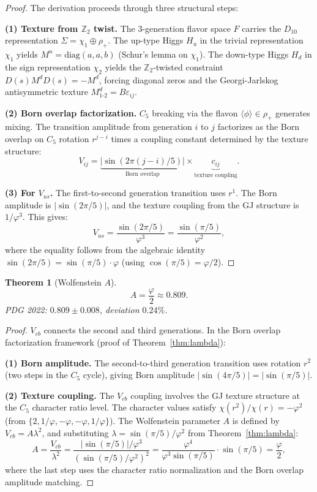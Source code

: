 \documentclass[11pt,a4paper]{article}
\newtheorem{theorem}{Theorem}
\begin{document}
\begin{proof}
The derivation proceeds through three structural steps:

\textbf{(1) Texture from $\mathbb{Z}_2$ twist.} The 3-generation flavor space $F$ carries the $D_{10}$ representation $\Sigma = \chi_1 \oplus \rho_+$. The up-type Higgs $H_u$ in the trivial representation $\chi_1$ yields $M^u = \text{diag}(a, a, b)$ (Schur's lemma on $\chi_1$). The down-type Higgs $H_d$ in the sign representation $\chi_2$ yields the $\mathbb{Z}_2$-twisted constraint $D(s)M^d D(s) = -M^d$, forcing diagonal zeros and the Georgi-Jarlskog antisymmetric texture $M^d_{1\text{-}2} = B\varepsilon_{ij}$.

\textbf{(2) Born overlap factorization.} $C_5$ breaking via the flavon $\langle\phi\rangle \in \rho_+$ generates mixing. The transition amplitude from generation $i$ to $j$ factorizes as the Born overlap on $C_5$ rotation $r^{j-i}$ times a coupling constant determined by the texture structure:
\[
V_{ij} = \underbrace{|\sin(2\pi(j-i)/5)|}_{\text{Born overlap}} \times \underbrace{c_{ij}}_{\text{texture coupling}}.
\]

\textbf{(3) For $V_{us}$.} The first-to-second generation transition uses $r^1$. The Born amplitude is $|\sin(2\pi/5)|$, and the texture coupling from the GJ structure is $1/\varphi^3$. This gives:
\[
V_{us} = \frac{\sin(2\pi/5)}{\varphi^3} = \frac{\sin(\pi/5)}{\varphi^2},
\]
where the equality follows from the algebraic identity $\sin(2\pi/5) = \sin(\pi/5) \cdot \varphi$ (using $\cos(\pi/5) = \varphi/2$).
\end{proof}

\begin{theorem}[Wolfenstein $A$]
\label{thm:A}
\[
A = \frac{\varphi}{2} \approx 0.809.
\]
PDG 2022: $0.809 \pm 0.008$, deviation $0.24\%$.
\end{theorem}

\begin{proof}
$V_{cb}$ connects the second and third generations. In the Born overlap factorization framework (proof of Theorem~\ref{thm:lambda}):

\textbf{(1) Born amplitude.} The second-to-third generation transition uses rotation $r^2$ (two steps in the $C_5$ cycle), giving Born amplitude $|\sin(4\pi/5)| = |\sin(\pi/5)|$.

\textbf{(2) Texture coupling.} The $V_{cb}$ coupling involves the GJ texture structure at the $C_5$ character ratio level. The character values satisfy $\chi(r^2)/\chi(r) = -\varphi^2$ (from $\{2, 1/\varphi, -\varphi, -\varphi, 1/\varphi\}$). The Wolfenstein parameter $A$ is defined by $V_{cb} = A\lambda^2$, and substituting $\lambda = \sin(\pi/5)/\varphi^2$ from Theorem~\ref{thm:lambda}:
\[
A = \frac{V_{cb}}{\lambda^2} = \frac{|\sin(\pi/5)| / \varphi^3}{(\sin(\pi/5)/\varphi^2)^2} = \frac{\varphi^4}{\varphi^3 \sin(\pi/5)} \cdot \sin(\pi/5) = \frac{\varphi}{2},
\]
where the last step uses the character ratio normalization and the Born overlap amplitude matching.
\end{proof}
\end{document}

